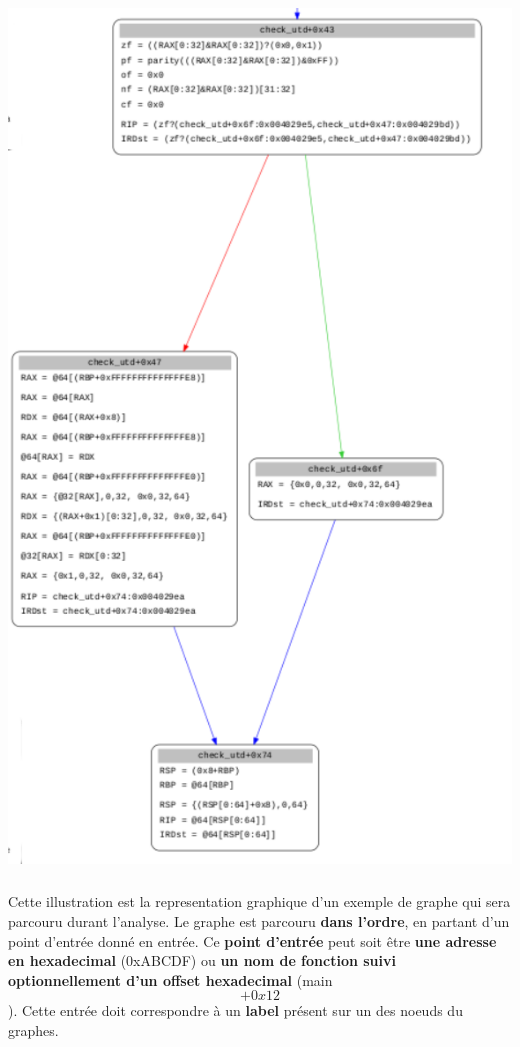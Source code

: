 \begin{center}
\includegraphics[scale=0.3]{condition.png}\newline
\end{center}
\subparagraph{}
Cette illustration est la representation graphique d'un exemple de graphe qui sera parcouru durant l'analyse. Le graphe est parcouru \textbf{dans l'ordre},
en partant d'un point d'entrée donné en entrée. Ce \textbf{point d'entrée} peut soit être \textbf{une adresse en hexadecimal} (0xABCDF) ou \textbf{un nom de fonction
suivi optionnellement d'un offset hexadecimal} (main\[+0x12\]). Cette entrée doit correspondre à un \textbf{label} présent sur un des noeuds du graphes.
